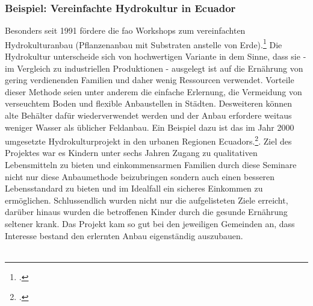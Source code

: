 \documentclass{scrartcl}
\begin{document}
\subsubsection*{Beispiel: Vereinfachte Hydrokultur in Ecuador}
Besonders seit 1991 fördere die \acs{fao} Workshops zum vereinfachten Hydrokulturanbau (Pflanzenanbau mit Substraten anstelle von Erde).\footcites[Vgl.][o.P. (S.1)]{Stajano2003SIMPLIFIEDEcuador} Die  Hydrokultur unterscheide sich von hochwertigen Variante in dem Sinne, dass sie - im Vergleich zu industriellen Produktionen - ausgelegt ist auf die Ernährung von gering verdienenden Familien und daher wenig Ressourcen verwendet. Vorteile dieser Methode seien unter anderem die einfache Erlernung, die Vermeidung von verseuchtem Boden und flexible Anbaustellen in Städten. Desweiteren können alte Behälter dafür wiederverwendet werden und der Anbau erfordere weitaus weniger Wasser als üblicher Feldanbau. Ein Beispiel dazu ist das im Jahr 2000 umgesetzte Hydrokulturprojekt in den urbanen Regionen Ecuadors.\footcite[Vgl.][o.P. (S.2f)]{Stajano2003SIMPLIFIEDEcuador}. Ziel des Projektes war es Kindern unter sechs Jahren Zugang zu qualitativen Lebensmitteln zu bieten und einkommensarmen Familien durch diese Seminare nicht nur diese Anbaumethode beizubringen sondern auch einen besseren Lebensstandard zu bieten und im Idealfall ein sicheres Einkommen zu ermöglichen. Schlussendlich wurden nicht nur die aufgelisteten Ziele erreicht, darüber hinaus wurden die betroffenen Kinder durch die gesunde Ernährung seltener krank. Das Projekt kam so gut bei den jeweiligen Gemeinden an, dass Interesse bestand den erlernten Anbau eigenständig auszubauen. \\
\\
\end{document}

